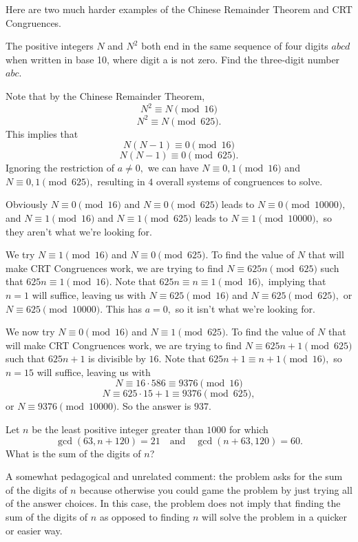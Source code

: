 \documentclass[mast]{lucky}
\begin{document}
Here are two much harder examples of the Chinese Remainder Theorem and CRT Congruences.

\begin{exam}[AIME I 2014/8]
The positive integers $N$ and $N^2$ both end in the same sequence of four digits $abcd$ when written in base 10, where digit a is not zero. Find the three-digit number $abc$.
\end{exam}

\begin{sol}
Note that by the Chinese Remainder Theorem,
\[N^2\equiv N\pmod {16}\]
\[N^2\equiv N\pmod{625}.\]
This implies that
\[N(N-1)\equiv 0\pmod{16}\]
\[N(N-1)\equiv 0\pmod{625}.\]
Ignoring the restriction of $a\neq 0,$ we can have $N\equiv 0,1\pmod{16}$ and $N\equiv 0,1\pmod{625},$ resulting in $4$ overall systems of congruences to solve.

Obviously $N\equiv 0\pmod{16}$ and $N\equiv 0\pmod{625}$ leads to $N\equiv 0\pmod{10000},$ and $N\equiv 1\pmod{16}$ and $N\equiv 1\pmod{625}$ leads to $N\equiv 1\pmod{10000},$ so they aren't what we're looking for.

We try $N\equiv 1\pmod{16}$ and $N\equiv 0\pmod{625}.$ To find the value of $N$ that will make CRT Congruences work, we are trying to find $N\equiv 625n\pmod{625}$ such that $625n\equiv 1\pmod{16}.$ Note that $625n\equiv n\equiv 1\pmod{16},$ implying that $n=1$ will suffice, leaving us with $N\equiv 625\pmod{16}$ and $N\equiv 625\pmod{625},$ or $N\equiv 625\pmod{10000}.$ This has $a=0,$ so it isn't what we're looking for.

We now try $N\equiv 0\pmod{16}$ and $N\equiv 1\pmod{625}.$ To find the value of $N$ that will make CRT Congruences work, we are trying to find $N\equiv 625n+1\pmod{625}$ such that $625n+1$ is divisible by $16.$ Note that $625n+1\equiv n+1\pmod{16},$ so $n=15$ will suffice, leaving us with
\[N\equiv 16\cdot 586\equiv 9376\pmod{16}\]
\[N\equiv 625\cdot 15+1\equiv 9376\pmod{625},\]
or $N\equiv 9376\pmod{10000}.$ So the answer is $937.$
\end{sol}

\begin{exam}[AMC 10A 2020/24]
Let $n$ be the least positive integer greater than $1000$ for which\[\gcd(63, n+120) =21\quad \text{and} \quad \gcd(n+63, 120)=60.\]What is the sum of the digits of $n$?
\end{exam}

A somewhat pedagogical and unrelated comment: the problem asks for the sum of the digits of $n$ because otherwise you could game the problem by just trying all of the answer choices. In this case, the problem does not imply that finding the sum of the digits of $n$ as opposed to finding $n$ will solve the problem in a quicker or easier way.
\end{document}
